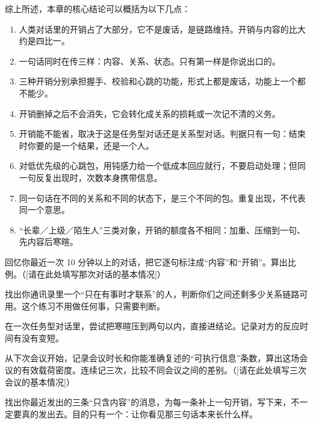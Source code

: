 

综上所述，本章的核心结论可以概括为以下几点：

\begin{enumerate}[label=\bfseries\arabic*., leftmargin=2.4em, labelsep=0.7em,
                  itemsep=0.45em, topsep=0.2em, parsep=0.2em]
\item 人类对话里的开销占了大部分，它不是废话，是链路维持。开销与内容的比大约是四比一。
\item 一句话同时在传三样：内容、关系、状态。只有第一样是你说出口的。
\item 三种开销分别承担握手、校验和心跳的功能，形式上都是废话，功能上一个都不能少。
\item 开销删掉之后不会消失，它会转化成关系的损耗或一次记不清的义务。
\item 开销能不能省，取决于这是任务型对话还是关系型对话。判据只有一句：结束时你要的是一个结果，还是一个人。
\item 对低优先级的心跳包，用钝感力给一个低成本回应就行，不要启动处理；但同一句反复出现时，次数本身携带信息。
\item 同一句话在不同的关系和不同的状态下，是三个不同的包。重复出现，不代表同一个意思。
\item “长辈／上级／陌生人”三类对象，开销的额度各不相同：加重、压缩到一句、先内容后寒暄。
\end{enumerate}

\begin{exercisessec}
\item 回忆你最近一次 10 分钟以上的对话，把它逐句标注成“内容”和“开销”。算出比例。（[请在此处填写那次对话的基本情况]）

\item 找出你通讯录里一个“只在有事时才联系”的人，判断你们之间还剩多少关系链路可用。这个练习不用做任何事，只需要判断。

\item 在一次任务型对话里，尝试把寒暄压到两句以内，直接进结论。记录对方的反应时间有没有变短。

\item 从下次会议开始，记录会议时长和你能准确复述的“可执行信息”条数，算出这场会议的有效载荷密度。连续记三次，比较不同会议之间的差别。（[请在此处填写三次会议的基本情况]）

\item 找出你最近发出的三条“只含内容”的消息，为每一条补上一句开销，写下来，不一定要真的发出去。目的只有一个：让你看见那三句话本来长什么样。
\end{exercisessec}

